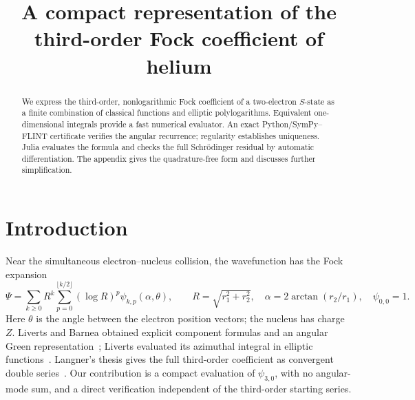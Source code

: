 \documentclass[10pt]{article}
\title{A compact representation of the third-order Fock coefficient of helium}
\author{}
\date{}
\begin{document}
\maketitle
\vspace{-1.5em}
\begin{abstract}
We express the third-order, nonlogarithmic Fock coefficient of a two-electron $S$-state as a finite combination of classical functions and elliptic polylogarithms.
Equivalent one-dimensional integrals provide a fast numerical evaluator.
An exact Python/SymPy--FLINT certificate verifies the angular recurrence; regularity establishes uniqueness.
Julia evaluates the formula and checks the full Schr\"odinger residual by automatic differentiation.
The appendix gives the quadrature-free form and discusses further simplification.
\end{abstract}

\section{Introduction}
Near the simultaneous electron--nucleus collision, the wavefunction has the Fock expansion
\begin{equation}
 \Psi=\sum_{k\ge0}R^k\sum_{p=0}^{\lfloor k/2\rfloor}(\log R)^p\psi_{k,p}(\alpha,\theta),
 \qquad R=\sqrt{r_1^2+r_2^2},\quad\alpha=2\arctan(r_2/r_1),\quad\psi_{0,0}=1.
\end{equation}
Here $\theta$ is the angle between the electron position vectors; the nucleus  has charge $Z$.
Liverts and Barnea obtained explicit component formulas and an angular Green representation~\cite{LB2015,LB2017}; Liverts evaluated its azimuthal integral in elliptic functions~\cite{L2021}.
Langner's thesis gives the full third-order coefficient as convergent double series~\cite{Langner2022}.
Our contribution is a compact evaluation of $\psi_{3,0}$, with no angular-mode sum, and a direct verification independent of the third-order starting series.
\end{document}
